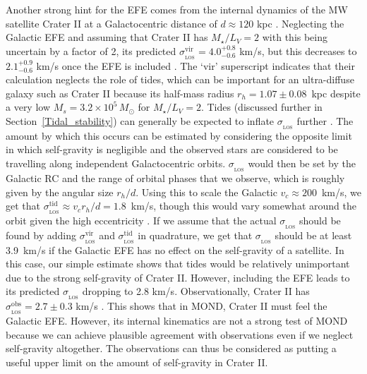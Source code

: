 \documentclass[fleqn,usenatbib,useAMS,onecolumn]{mnras} %
\begin{document}
Another strong hint for the EFE comes from the internal dynamics of the MW satellite Crater II at a Galactocentric distance of $d \approx 120$ kpc \citep{Torrealba_2016}. Neglecting the Galactic EFE and assuming that Crater II has $M_{\star}/L_V = 2$ with this being uncertain by a factor of 2, its predicted $\sigma_{_\text{LOS}}^{\text{vir}} = 4.0_{-0.6}^{+0.8}$ km/s, but this decreases to $2.1_{-0.6}^{+0.9}$ km/s once the EFE is included \citep{McGaugh_2016_CraterII}. The `vir' superscript indicates that their calculation neglects the role of tides, which can be important for an ultra-diffuse galaxy such as Crater II because its half-mass radius $r_h = 1.07 \pm 0.08$~kpc \citep[table~4 of][]{Torrealba_2016} despite a very low $M_s = 3.2 \times 10^5 \, M_\odot$ for $M_{\star}/L_V = 2$. Tides (discussed further in Section~\ref{Tidal_stability}) can generally be expected to inflate $\sigma_{_\text{LOS}}$ further \citep[figure~4 of][]{Brada_2000_tides}. The amount by which this occurs can be estimated by considering the opposite limit in which self-gravity is negligible and the observed stars are considered to be travelling along independent Galactocentric orbits. $\sigma_{_\text{LOS}}$ would then be set by the Galactic RC and the range of orbital phases that we observe, which is roughly given by the angular size $r_h/d$. Using this to scale the Galactic $v_c \approx 200$~km/s, we get that $\sigma_{_\text{LOS}}^{\text{tid}} \approx v_c r_h/d = 1.8$~km/s, though this would vary somewhat around the orbit given the high eccentricity \citep{Hefan_Li_2021}. If we assume that the actual $\sigma_{_\text{LOS}}$ should be found by adding $\sigma_{_\text{LOS}}^{\text{vir}}$ and $\sigma_{_\text{LOS}}^{\text{tid}}$ in quadrature, we get that $\sigma_{_\text{LOS}}$ should be at least 3.9~km/s if the Galactic EFE has no effect on the self-gravity of a satellite. In this case, our simple estimate shows that tides would be relatively unimportant due to the strong self-gravity of Crater II. However, including the EFE leads to its predicted $\sigma_{_\text{LOS}}$ dropping to 2.8 km/s. Observationally, Crater II has $\sigma_{_\text{LOS}}^{\text{obs}} = 2.7 \pm 0.3$ km/s \citep{Caldwell_2017}. This shows that in MOND, Crater II must feel the Galactic EFE. However, its internal kinematics are not a strong test of MOND because we can achieve plausible agreement with observations even if we neglect self-gravity altogether. The observations can thus be considered as putting a useful upper limit on the amount of self-gravity in Crater II.

\end{document}
